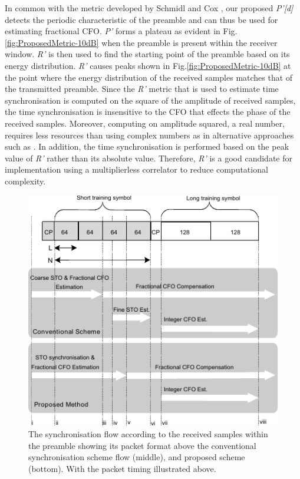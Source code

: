 In common with the metric developed by Schmidl and Cox \cite{Schmidl1997}, our proposed \emph{P'[d]} detects the periodic characteristic of the preamble and can thus be used for estimating fractional CFO. 
\emph{P'} forms a plateau as evident in Fig.\ref{fig:ProposedMetric-10dB} when the preamble is present within the receiver window. 
\emph{R'} is then used to find the starting point of the preamble based on its energy distribution. 
\emph{R'} causes peaks shown in Fig.\ref{fig:ProposedMetric-10dB} at the point where the energy distribution of the received samples matches that of the transmitted preamble.  
Since the \emph{R'} metric that is used to estimate time synchronisation is computed on the square of the amplitude of received samples, the time synchronisation is insensitive to the CFO that effects the phase of the received samples.
Moreover, computing on amplitude squared, a real number, requires less resources than using complex numbers as in alternative approaches such as \cite{Kishore2006}.
In addition, the time synchronisation is performed based on the peak value of \emph{R'} rather than its absolute value. 
Therefore, \emph{R'} is a good candidate for implementation using a multiplierless correlator to reduce computational complexity. 
\begin{figure}
	\centerline{\includegraphics [width=1\columnwidth] {figures/SynFlow_IVMannotated.pdf}}
	\caption{The synchronisation flow according to the received samples within the preamble showing its packet format above the conventional synchronisation scheme flow (middle), and proposed scheme (bottom). With the packet timing illustrated above.}
	\label{fig:SyncFlow}
\end{figure}
